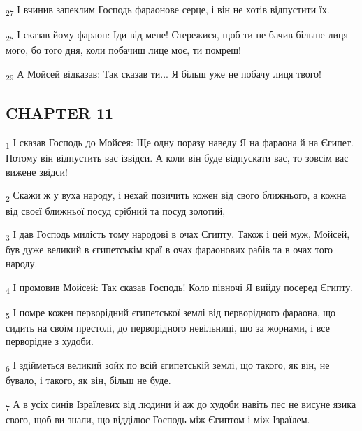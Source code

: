 \begin{tcolorbox}
\textsubscript{27} І вчинив запеклим Господь фараонове серце, і він не хотів відпустити їх.
\end{tcolorbox}
\begin{tcolorbox}
\textsubscript{28} І сказав йому фараон: Іди від мене! Стережися, щоб ти не бачив більше лиця мого, бо того дня, коли побачиш лице моє, ти помреш!
\end{tcolorbox}
\begin{tcolorbox}
\textsubscript{29} А Мойсей відказав: Так сказав ти... Я більш уже не побачу лиця твого!
\end{tcolorbox}
\subsection{CHAPTER 11}
\begin{tcolorbox}
\textsubscript{1} І сказав Господь до Мойсея: Ще одну поразу наведу Я на фараона й на Єгипет. Потому він відпустить вас ізвідси. А коли він буде відпускати вас, то зовсім вас вижене звідси!
\end{tcolorbox}
\begin{tcolorbox}
\textsubscript{2} Скажи ж у вуха народу, і нехай позичить кожен від свого ближнього, а кожна від своєї ближньої посуд срібний та посуд золотий,
\end{tcolorbox}
\begin{tcolorbox}
\textsubscript{3} І дав Господь милість тому народові в очах Єгипту. Також і цей муж, Мойсей, був дуже великий в єгипетськім краї в очах фараонових рабів та в очах того народу.
\end{tcolorbox}
\begin{tcolorbox}
\textsubscript{4} І промовив Мойсей: Так сказав Господь! Коло півночі Я вийду посеред Єгипту.
\end{tcolorbox}
\begin{tcolorbox}
\textsubscript{5} І помре кожен перворідний єгипетської землі від перворідного фараона, що сидить на своїм престолі, до перворідного невільниці, що за жорнами, і все перворідне з худоби.
\end{tcolorbox}
\begin{tcolorbox}
\textsubscript{6} І здійметься великий зойк по всій єгипетській землі, що такого, як він, не бувало, і такого, як він, більш не буде.
\end{tcolorbox}
\begin{tcolorbox}
\textsubscript{7} А в усіх синів Ізраїлевих від людини й аж до худоби навіть пес не висуне язика свого, щоб ви знали, що відділює Господь між Єгиптом і між Ізраїлем.
\end{tcolorbox}
